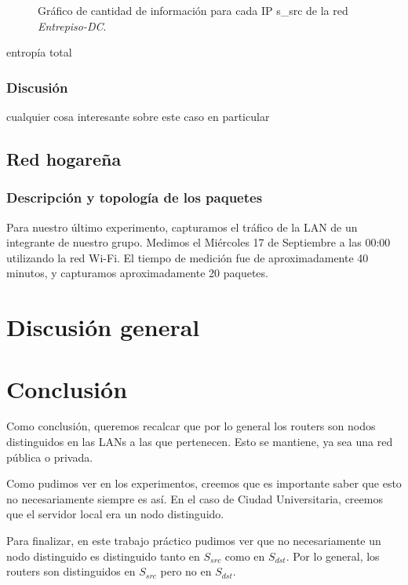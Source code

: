 \documentclass[10pt, a4paper]{article}
\begin{document}
\begin{figure}[H]
\begin{minipage}{0.48\linewidth}
    \caption{Gráfico de cantidad de información para cada IP s\_src de la red \emph{Entrepiso-DC}.}
    \label{fig:informacion-entrepiso-dc-s-src}
  \end{minipage}
\end{figure}

entropía total

\subsubsection{Discusión}

cualquier cosa interesante sobre este caso en particular

\subsection{Red hogareña}

\subsubsection{Descripción y topología de los paquetes}

Para nuestro último experimento, capturamos el tráfico de la LAN de un integrante de nuestro grupo. Medimos el Miércoles 17 de Septiembre a las 00:00 utilizando la red Wi-Fi. El tiempo de medición fue de aproximadamente 40 minutos, y capturamos aproximadamente 20 paquetes.

\section{Discusión general}

\section{Conclusión}
Como conclusión, queremos recalcar que por lo general los routers son nodos distinguidos en las LANs a las que pertenecen. Esto se mantiene, ya sea una red pública o privada.

Como pudimos ver en los experimentos, creemos que es importante saber que esto no necesariamente siempre es así. En el caso de Ciudad Universitaria, creemos que el servidor local era un nodo distinguido.

Para finalizar, en este trabajo práctico pudimos ver que no necesariamente un nodo distinguido es distinguido tanto en $S_{src}$ como en $S_{dst}$. Por lo general, los routers son distinguidos en $S_{src}$ pero no en $S_{dst}$.
\end{document}
